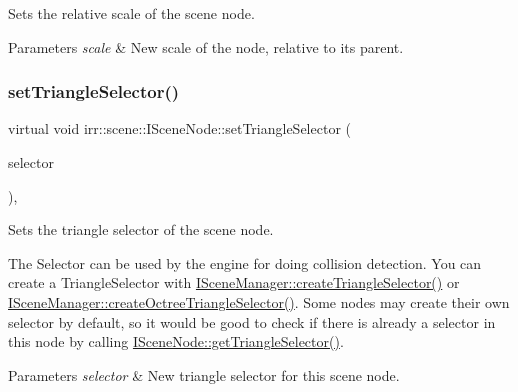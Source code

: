 Sets the relative scale of the scene node. 


\begin{DoxyParams}{Parameters}
{\em scale} & New scale of the node, relative to its parent. \\
\hline
\end{DoxyParams}
\mbox{\label{classirr_1_1scene_1_1ISceneNode_a87fb52ec54bf3ae117340d8defd1255f}} 
\subsubsection{\texorpdfstring{set\+Triangle\+Selector()}{setTriangleSelector()}}
{\footnotesize\ttfamily virtual void irr\+::scene\+::\+I\+Scene\+Node\+::set\+Triangle\+Selector (\begin{DoxyParamCaption}\item[{\hyperlink{classirr_1_1scene_1_1ITriangleSelector}{I\+Triangle\+Selector} $\ast$}]{selector }\end{DoxyParamCaption})\hspace{0.3cm}{\ttfamily [inline]}, {\ttfamily [virtual]}}



Sets the triangle selector of the scene node. 

The Selector can be used by the engine for doing collision detection. You can create a Triangle\+Selector with \hyperlink{classirr_1_1scene_1_1ISceneManager_a266625379b1558e9be1dc062ea4e71f7}{I\+Scene\+Manager\+::create\+Triangle\+Selector()} or \hyperlink{classirr_1_1scene_1_1ISceneManager_a4ed7d3b34f4d0c70395b6d464fe32b96}{I\+Scene\+Manager\+::create\+Octree\+Triangle\+Selector()}. Some nodes may create their own selector by default, so it would be good to check if there is already a selector in this node by calling \hyperlink{classirr_1_1scene_1_1ISceneNode_ab820f7ccfdd317d3913316b6991ea5d9}{I\+Scene\+Node\+::get\+Triangle\+Selector()}. 
\begin{DoxyParams}{Parameters}
{\em selector} & New triangle selector for this scene node. \\
\hline
\end{DoxyParams}
\mbox{\label{classirr_1_1scene_1_1ISceneNode_a2e3a88fe87d11caa7986a203afe6838c}} 
